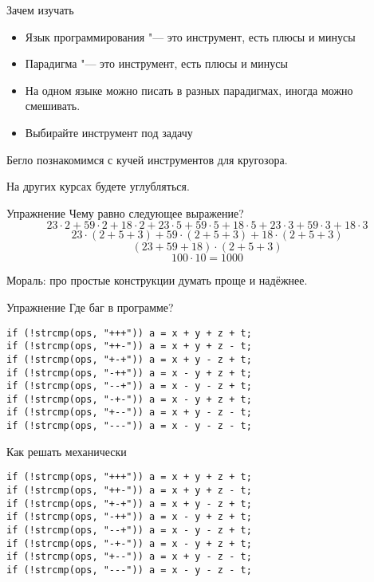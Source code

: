 \begin{frame}[t,fragile]{Зачем изучать}
	\begin{itemize}
	\item Язык программирования "--- это инструмент, есть плюсы и минусы
	\item Парадигма "--- это инструмент, есть плюсы и минусы
	\item На одном языке можно писать в разных парадигмах, иногда можно смешивать.
	\item Выбирайте инструмент под задачу
	\end{itemize}
	Бегло познакомимся с кучей инструментов для кругозора.

	На других курсах будете углубляться.
\end{frame}

\begin{frame}[t,fragile]{Упражнение}
	Чему равно следующее выражение?
	\[
	23 \cdot 2 + 59 \cdot 2 + 18 \cdot 2 +
	23 \cdot 5 + 59 \cdot 5 + 18 \cdot 5 +
	23 \cdot 3 + 59 \cdot 3 + 18 \cdot 3
	\]
	\pause
	\[
	23 \cdot (2 + 5 + 3) + 59 \cdot (2 + 5 + 3) + 18 \cdot (2 + 5 + 3)
	\]
	\pause
	\[
	(23 + 59 + 18) \cdot (2 + 5 + 3)
	\]
	\pause
	\[
	100 \cdot 10 = 1000
	\]

	Мораль: про простые конструкции думать проще и надёжнее.
\end{frame}

\begin{frame}[t,fragile]{Упражнение}
	Где баг в программе?
\begin{verbatim}
if (!strcmp(ops, "+++")) a = x + y + z + t;
if (!strcmp(ops, "++-")) a = x + y + z - t;
if (!strcmp(ops, "+-+")) a = x + y - z + t;
if (!strcmp(ops, "-++")) a = x - y + z + t;
if (!strcmp(ops, "--+")) a = x - y - z + t;
if (!strcmp(ops, "-+-")) a = x - y + z + t;
if (!strcmp(ops, "+--")) a = x + y - z - t;
if (!strcmp(ops, "---")) a = x - y - z - t;
\end{verbatim}
\end{frame}

\begin{frame}[t,fragile]{Как решать механически}
\begin{verbatim}
if (!strcmp(ops, "+++")) a = x + y + z + t;
if (!strcmp(ops, "++-")) a = x + y + z - t;
if (!strcmp(ops, "+-+")) a = x + y - z + t;
if (!strcmp(ops, "-++")) a = x - y + z + t;
if (!strcmp(ops, "--+")) a = x - y - z + t;
if (!strcmp(ops, "-+-")) a = x - y + z + t;
if (!strcmp(ops, "+--")) a = x + y - z - t;
if (!strcmp(ops, "---")) a = x - y - z - t;
\end{verbatim}
\end{frame}

